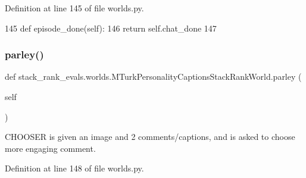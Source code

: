 Definition at line 145 of file worlds.\+py.


\begin{DoxyCode}
145     \textcolor{keyword}{def }episode\_done(self):
146         \textcolor{keywordflow}{return} self.chat\_done
147 
\end{DoxyCode}
\mbox{\label{classstack__rank__evals_1_1worlds_1_1MTurkPersonalityCaptionsStackRankWorld_a41817ec1f909df958b73f3b5d810299e}} 
\subsubsection{\texorpdfstring{parley()}{parley()}}
{\footnotesize\ttfamily def stack\+\_\+rank\+\_\+evals.\+worlds.\+M\+Turk\+Personality\+Captions\+Stack\+Rank\+World.\+parley (\begin{DoxyParamCaption}\item[{}]{self }\end{DoxyParamCaption})}

\begin{DoxyVerb}CHOOSER is given an image and 2 comments/captions, and is asked to choose more
engaging comment.
\end{DoxyVerb}
 

Definition at line 148 of file worlds.\+py.


